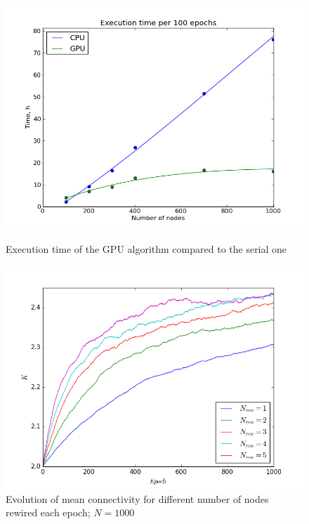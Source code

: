 \documentclass[procedia]{easychair}
\begin{document}
	\begin{figure}[ht!]
		\begin{minipage}[t]{0.45\textwidth}
			\includegraphics[width=1.0\textwidth]{plots/speedup}
			\caption{Execution time of the GPU algorithm compared to the serial one}
			\label{fig:speedup}
		\end{minipage}\hfill
		\begin{minipage}[t]{0.45\textwidth}
			\includegraphics[width=1.0\textwidth]{plots/n_rew}
			\caption{Evolution of mean connectivity for different number of nodes rewired each epoch; $N=1000$}
		\end{minipage}
	\end{figure}
	
\end{document}
